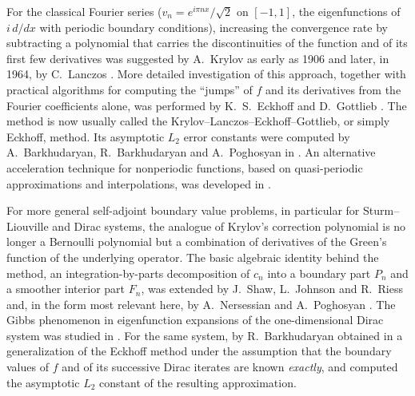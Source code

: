 \documentclass[11pt,a4paper]{article}
\theoremstyle{definition}
\begin{document}
For the classical Fourier series ($v_n=e^{i\pi n x}/\sqrt{2}$ on
$[-1,1]$, the eigenfunctions of $i\,d/dx$ with periodic boundary
conditions), increasing the convergence rate by subtracting a
polynomial that carries the discontinuities of the function and of its
first few derivatives was suggested by A.~Krylov as early as 1906
\cite{KR} and later, in 1964, by C.~Lanczos \cite{Lc2,Lc}. More
detailed investigation of this approach, together with practical
algorithms for computing the ``jumps'' of $f$ and its derivatives from
the Fourier coefficients alone, was performed by K.~S.~Eckhoff and
D.~Gottlieb \cite{E1,E2,E3,EW,GG,GSSV}. The method is now usually
called the Krylov--Lanczos--Eckhoff--Gottlieb, or simply Eckhoff,
method. Its asymptotic $L_2$ error constants were computed by A.~Barkhudaryan, R.~Barkhudaryan and A.~Poghosyan in \cite{BBP}. An alternative acceleration technique for nonperiodic
functions, based on quasi-periodic approximations and interpolations,
was developed in \cite{Poghosyan20201,Poghosyan20211,Poghosyan2024}.


For more general self-adjoint boundary value problems, in particular for
Sturm--Liouville and Dirac systems, the analogue of Krylov's correction
polynomial is no longer a Bernoulli polynomial but a combination of
derivatives of the Green's function of the underlying operator. The
basic algebraic identity behind the method, an integration-by-parts
decomposition of $c_n$ into a boundary part $P_n$ and a smoother
interior part $F_n$, was extended by J.~Shaw, L.~Johnson and R.~Riess
\cite{SJR} and, in the form most relevant here, by A.~Nersessian and
A.~Poghosyan \cite{NP1,NP5,NP6}. The Gibbs phenomenon in eigenfunction
expansions of the one-dimensional Dirac system was studied in
\cite{Bgibbs}. For the same system, by R.~Barkhudaryan obtained in
\cite{Bdirac,Baip} a generalization of the Eckhoff method under
the assumption that the boundary values of $f$ and of its successive
Dirac iterates are known \emph{exactly}, and computed the asymptotic
$L_2$ constant of the resulting approximation.
\end{document}
